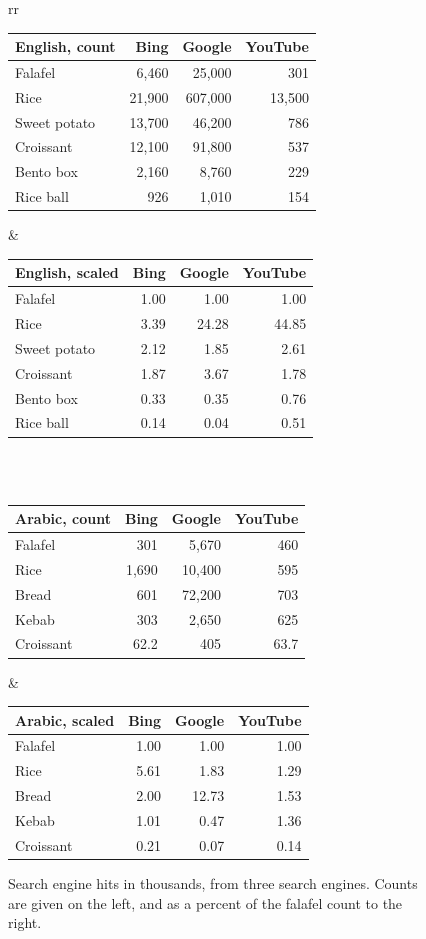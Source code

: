 \documentclass[a4paper,10pt]{article}
\begin{document}
\begin{figure}
\hspace{-2cm}
\begin{tabular}{rr}

\begin{tabular}{l|rrr}
{\bf English, count} & Bing & Google & YouTube \\\hline
Falafel  & 6,460 & 25,000 & 301\\
Rice    & 21,900 & 607,000 & 13,500\\
Sweet potato & 13,700 & 46,200 & 786\\
Croissant & 12,100 & 91,800 & 537 \\
Bento box & 2,160 & 8,760 & 229 \\
Rice ball & 926 & 1,010 & 154\\
\end{tabular}

&

\begin{tabular}{l|rrr}
{\bf English, scaled} & Bing & Google & YouTube \\\hline

Falafel  &1.00& 1.00 & 1.00 \\
Rice    &3.39&24.28 & 44.85 \\
Sweet potato &2.12& 1.85 & 2.61 \\
Croissant &1.87& 3.67 & 1.78 \\
Bento box &0.33& 0.35 & 0.76 \\
Rice ball &0.14& 0.04 & 0.51
\end{tabular}
\\
\phantom{Filler}\\

\begin{tabular}{l|rrr}
{\bf Arabic, count} & Bing & Google & YouTube \\\hline
Falafel & 301  & 5,670 & 460\\
Rice & 1,690& 10,400 & 595\\
Bread  & 601& 72,200   & 703\\
Kebab & 303 & 2,650   & 625\\
Croissant & 62.2 & 405 & 63.7
\end{tabular}

&
\begin{tabular}{l|rrr}
{\bf Arabic, scaled} & Bing & Google & YouTube \\\hline
Falafel & 1.00 & 1.00  & 	1.00\\
Rice & 5.61 & 1.83	 &  1.29\\
Bread & 2.00 & 12.73 &    1.53\\
Kebab & 1.01 & 0.47	 &  1.36\\
Croissant & 0.21 & 0.07	 &  0.14
\end{tabular}

\end{tabular}
\caption{Search engine hits in thousands, from three search engines. Counts are given on
the left, and as a percent of the falafel count to the right.}
\label{counttab}

\end{figure}
\end{document}
